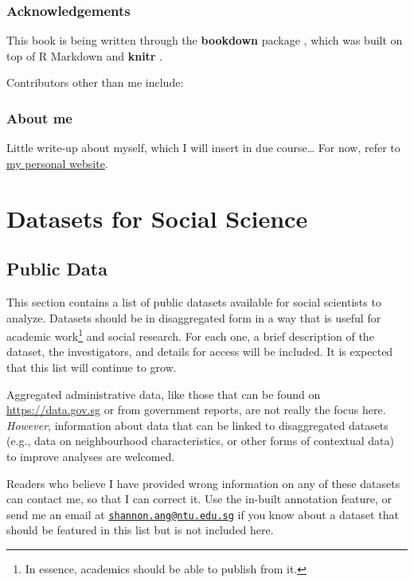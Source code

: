 \documentclass[
  openany]{book}
\begin{document}
\hypertarget{acknowledgements}{%
\section*{Acknowledgements}\label{acknowledgements}}

This book is being written through the \textbf{bookdown} package \citep{R-bookdown}, which was built on top of R Markdown and \textbf{knitr} \citep{xie2015}.

Contributors other than me include:

\hypertarget{about-me}{%
\section*{About me}\label{about-me}}

Little write-up about myself, which I will insert in due course\ldots{} For now, refer to \href{https://www.shannonang.net}{my personal website}.

\hypertarget{part-datasets-for-social-science}{%
\part{Datasets for Social Science}\label{part-datasets-for-social-science}}

\hypertarget{publicdata}{%
\chapter{Public Data}\label{publicdata}}

This section contains a list of public datasets available for social scientists to analyze. Datasets should be in disaggregated form in a way that is useful for academic work\footnote{In essence, academics should be able to publish from it.} and social research. For each one, a brief description of the dataset, the investigators, and details for access will be included. It is expected that this list will continue to grow.

Aggregated administrative data, like those that can be found on \url{https://data.gov.sg} or from government reports, are not really the focus here. \emph{However}, information about data that can be linked to disaggregated datasets (e.g., data on neighbourhood characteristics, or other forms of contextual data) to improve analyses are welcomed.

Readers who believe I have provided wrong information on any of these datasets can contact me, so that I can correct it. Use the in-built annotation feature, or send me an email at \href{mailto:shannon.ang@ntu.edu.sg}{\nolinkurl{shannon.ang@ntu.edu.sg}} if you know about a dataset that should be featured in this list but is not included here.
\end{document}
